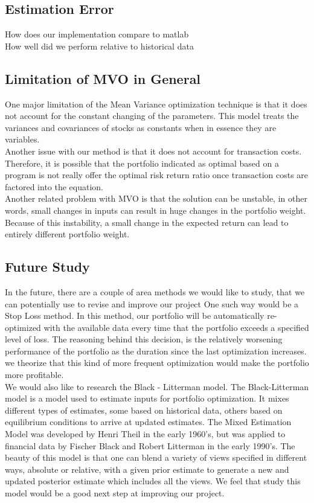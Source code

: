 \documentclass[12pt]{article}
\begin{document}
\subsection{Estimation Error}
How does our implementation compare to matlab\\
How well did we perform relative to historical data

\subsection{Limitation of MVO in General}
One major limitation of the Mean Variance optimization technique is that it does not account for the constant changing of the parameters. This model treats the variances and covariances of stocks as constants when in essence they are variables. \\

Another issue with our method is that it does not account for transaction costs. Therefore, it is possible that the portfolio indicated as optimal based on a program is not really offer the optimal risk return ratio once transaction costs are factored into the equation.\\

Another related problem with MVO is that the solution can be unstable, in other words, small changes in inputs can result in huge changes in the portfolio weight. Because of this instability, a small change in the expected return can lead to entirely different portfolio weight. \\

\subsection{Future Study}
In the future, there are a couple of area methods we would like to study, that we can potentially use to revise and improve our project
One such way would be a Stop Loss method. In this method, our portfolio will be automatically re-optimized with the available data every time that the portfolio exceeds a specified level of loss. The reasoning behind this decision, is the relatively worsening performance of the portfolio as the duration since the last optimization increases. we theorize that this kind of more frequent 
optimization would make the portfolio more profitable.\\

We would also like to research the Black - Litterman model. The Black-Litterman model is a model used to estimate inputs for portfolio optimization. It mixes different types of estimates, some based on historical data, others based on equilibrium conditions to arrive at updated estimates. The Mixed Estimation Model was developed by Henri Theil in the early 1960's, but was applied to financial data by Fischer Black and Robert Litterman in the early 1990's.
The beauty of this model is that one can blend a variety of views specified in different ways, absolute or relative, with a given prior estimate to generate a new and updated posterior estimate which includes all the views.  We feel that study this model would be a good next step at improving our project.\\
\end{document}
